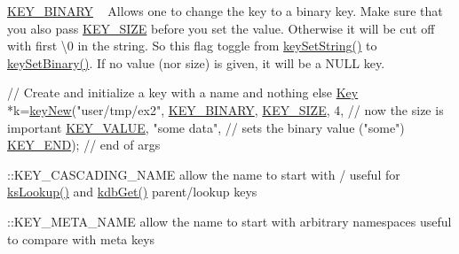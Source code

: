 \begin{DoxyItemize}
\item \hyperlink{group__key_gga91fb3178848bd682000958089abbaf40a1ca18d4e094ae7487d35ecedda2235ff}{K\+E\+Y\+\_\+\+B\+I\+N\+A\+R\+Y} ~\newline
 Allows one to change the key to a binary key. Make sure that you also pass \hyperlink{group__key_gga91fb3178848bd682000958089abbaf40a6d531b5c41445d19d0452eebdccbfa01}{K\+E\+Y\+\_\+\+S\+I\+Z\+E} before you set the value. Otherwise it will be cut off with first \textbackslash{}0 in the string. So this flag toggle from \hyperlink{group__keyvalue_ga622bde1eb0e0c4994728331326340ef2}{key\+Set\+String()} to \hyperlink{group__keyvalue_gaa50a5358fd328d373a45f395fa1b99e7}{key\+Set\+Binary()}. If no value (nor size) is given, it will be a N\+U\+L\+L key. 
\begin{DoxyCodeInclude}
\textcolor{comment}{// Create and initialize a key with a name and nothing else}
\hyperlink{classkdb_1_1Key_a5679f5cae63caddd64a60388b9cc77fa}{Key} *k=\hyperlink{group__key_gad23c65b44bf48d773759e1f9a4d43b89}{keyNew}(\textcolor{stringliteral}{"user/tmp/ex2"},
        \hyperlink{group__key_gga91fb3178848bd682000958089abbaf40a1ca18d4e094ae7487d35ecedda2235ff}{KEY\_BINARY},
        \hyperlink{group__key_gga91fb3178848bd682000958089abbaf40a6d531b5c41445d19d0452eebdccbfa01}{KEY\_SIZE}, 4,               \textcolor{comment}{// now the size is important}
        \hyperlink{group__key_gga91fb3178848bd682000958089abbaf40ac66e4a49d09212b79f5754ca6db5bd2e}{KEY\_VALUE}, \textcolor{stringliteral}{"some data"},    \textcolor{comment}{// sets the binary value ("some")}
        \hyperlink{group__key_gga91fb3178848bd682000958089abbaf40aa8adb6fcb92dec58fb19410eacfdd403}{KEY\_END});                  \textcolor{comment}{// end of args}
\end{DoxyCodeInclude}

\item \+::\+K\+E\+Y\+\_\+\+C\+A\+S\+C\+A\+D\+I\+N\+G\+\_\+\+N\+A\+M\+E allow the name to start with / useful for \hyperlink{group__keyset_gaa34fc43a081e6b01e4120daa6c112004}{ks\+Lookup()} and \hyperlink{group__kdb_ga28e385fd9cb7ccfe0b2f1ed2f62453a1}{kdb\+Get()} parent/lookup keys
\item \+::\+K\+E\+Y\+\_\+\+M\+E\+T\+A\+\_\+\+N\+A\+M\+E allow the name to start with arbitrary namespaces useful to compare with meta keys
\end{DoxyItemize}

